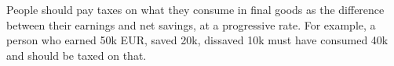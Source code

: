 People should pay taxes on what they consume in final goods as the difference between their earnings and net savings, at a progressive rate. For example, a person who earned 50k EUR, saved 20k, dissaved 10k must have consumed 40k and should be taxed on that.

